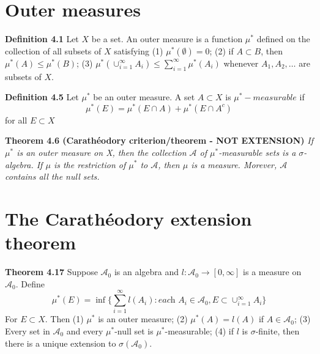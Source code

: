 \begin{sloppypar}
\section{Outer measures}
\noindent \textbf{Definition 4.1} Let $X$ be a set. An outer measure is a function $\mu^*$ defined on the collection of all subsets of $X$ satisfying
\newline (1) $\mu^*(\emptyset) = 0$;
\newline (2) if $A \subset B$, then $\mu^*(A) \leq \mu^*(B)$;
\newline (3) $\mu^*(\cup_{i=1}^\infty A_i) \leq \sum_{i=1}^\infty \mu^*(A_i)$ whenever $A_1,A_2,\ldots$ are subsets of $X$.

\noindent \textbf{Definition 4.5} Let $\mu^*$ be an outer measure. A set $A \subset X$ is $\mu^*-measurable$ if
$$\mu^*(E) = \mu^*(E \cap A) + \mu^*(E \cap A^c)$$
for all $E \subset X$

\noindent \textbf{Theorem 4.6 (Carath\'eodory criterion/theorem - NOT EXTENSION)}
\newline \textit{If $\mu^*$ is an outer measure on X, then the collection $\mathcal{A}$ of $\mu^*$-measurable sets is a $\sigma$-algebra. If $\mu$ is the restriction of $\mu^*$ to $\mathcal{A}$, then $\mu$ is a measure. Morever, $\mathcal{A}$ contains all the null sets.}

\setcounter{section}{3}
\section{The Carath\'eodory extension theorem}
\noindent \textbf{Theorem 4.17} Suppose $\mathcal{A}_0$ is an algebra and $l: \mathcal{A}_0 \to [0,\infty]$ is a measure on $\mathcal{A}_0$. Define
$$\mu^*(E) = \inf \lbrace \sum_{i=1}^\infty l(A_i): \textit{each } A_i \in \mathcal{A}_0, E \subset \cup_{i=1}^\infty A_i \rbrace$$
For $E \subset X$. Then
\newline (1) $\mu^*$ is an outer measure;
\newline (2) $\mu^*(A) = l(A)$ if $A \in \mathcal{A}_0$;
\newline (3) Every set in $\mathcal{A}_0$ and every $\mu^*$-null set is $\mu^*$-measurable;
\newline (4) if $l$ is $\sigma$-finite, then there is a unique extension to $\sigma(\mathcal{A}_0)$.

\end{sloppypar}
